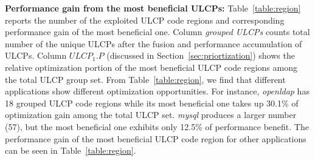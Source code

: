 \textbf{Performance gain from the most beneficial ULCPs:} Table~\ref{table:region} reports the number of the exploited ULCP code regions and corresponding performance gain of the most beneficial one.
Column \emph{grouped ULCPs} counts total number of the unique ULCPs after the fusion and performance accumulation of ULCPs.
Column $ULCP_1.P$ (discussed in Section~\ref{sec:priortization}) shows the relative optimization portion of the most beneficial ULCP code regions among the total ULCP group set.
From Table~\ref{table:region}, we find that different applications show different optimization opportunities. For instance, \emph{openldap} has 18 grouped ULCP code regions while its most beneficial one takes up 30.1\% of optimization gain among the total ULCP set. \emph{mysql} produces a larger number (57), but the most beneficial one exhibits only 12.5\% of performance benefit.
The performance gain of the most beneficial ULCP code region for other applications can be seen in Table~\ref{table:region}.



